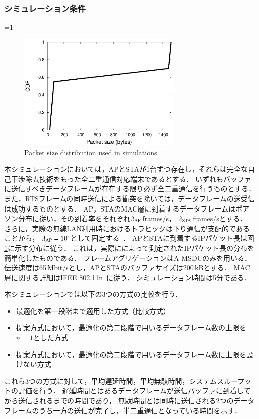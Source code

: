 \documentclass[master]{kuisthesis}		%
\newcounter{flagFig}
\begin{document}
		\subsubsection{シミュレーション条件}
			\ifnum\value{flagFig}=1 {\begin{figure}[t]
				\begin{center}
					\includegraphics[width=0.7\textwidth]{graph/traffic.eps}
					\caption{Packet size distribution used in simulations.}
					\label{fig:traffic}
				\end{center}
			\end{figure}}\fi
			本シミュレーションにおいては，APとSTAが1台ずつ存在し，それらは完全な自己干渉除去技術をもった全二重通信対応端末であるとする．
			いずれもバッファに送信すべきデータフレームが存在する限り必ず全二重通信を行うものとする．
			また，RTSフレームの同時送信による衝突を除いては，データフレームの送受信は成功するものとする．
			AP，STAのMAC層に到着するデータフレームはポアソン分布に従い，その到着率をそれぞれ$\lambda_{\rm{AP}}$\,frames/s，
			$\lambda_{\rm{STA}}$\,frames/sとする．
			さらに，実際の無線LAN利用時におけるトラヒックは下り通信が支配的であることから，
			$\lambda_{\rm{AP}}=10^{5}$として固定する~\cite{traffic}．
			APとSTAに到着するIPパケット長は図\ref{fig:traffic}に示す分布に従う．
			これは，実際に\cite{traffic}によって測定されたIPパケット長の分布を簡単化したものである．
			フレームアグリゲーションはA-MSDUのみを用いる．
			伝送速度は65\,Mbit/sとし，APとSTAのバッファサイズは200\,kBとする．
			MAC層に関する詳細はIEEE 802.11n~\cite{stdn}に従う．
			シミュレーション時間は5分である．
			\par
			本シミュレーションでは以下の3つの方式の比較を行う．
			\begin{itemize}
				\item 最適化を第一段階まで適用した方式（比較方式）
				\item 提案方式において，最適化の第二段階で用いるデータフレーム数の上限を$n=1$とした方式
				\item 提案方式において，最適化の第二段階で用いるデータフレーム数に上限を設けない方式
			\end{itemize}
			これら3つの方式に対して，平均遅延時間，平均無駄時間，システムスループットの評価を行う．
			遅延時間とはあるデータフレームが送信バッファに到着してから送信されるまでの時間であり，
			無駄時間とは同時に送信される2つのデータフレームのうち一方の送信が完了し，半二重通信となっている時間を示す．
\end{document}
